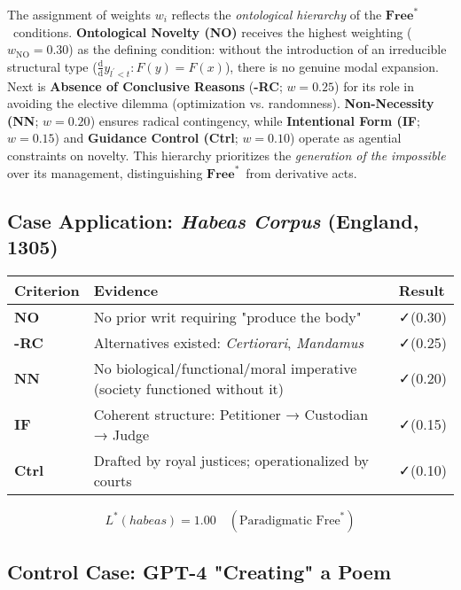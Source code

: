 \documentclass[11pt,a4paper]{article}
\newcommand{\Free}{\ensuremath{\mathbf{Free}^{\ast}}}
\begin{document}
The assignment of weights \(w_{i}\) reflects the \emph{ontological hierarchy} of the \Free\ conditions. \textbf{Ontological Novelty (NO)} receives the highest weighting (\(w_{\text{NO}}=0.30\)) as the defining condition: without the introduction of an irreducible structural type (\(\frac{\mathrm{d}}{\mathrm{d}}y_{l^{\prime}<t}:F(y)=F(x)\)), there is no genuine modal expansion. Next is \textbf{Absence of Conclusive Reasons} (\textbf{-RC}; \(w=0.25\)) for its role in avoiding the elective dilemma (optimization vs. randomness). \textbf{Non-Necessity (NN}; \(w=0.20\)) ensures radical contingency, while \textbf{Intentional Form (IF}; \(w=0.15\)) and \textbf{Guidance Control (Ctrl}; \(w=0.10\)) operate as agential constraints on novelty. This hierarchy prioritizes the \emph{generation of the impossible} over its management, distinguishing \Free\ from derivative acts.

\subsection{Case Application: \emph{Habeas Corpus} (England, 1305)}\label{sec:methods-habeas}

\begin{tabular}{l l l}
Criterion & Evidence & Result \\
\hline
\textbf{NO} & No prior writ requiring "produce the body" \cite[ p. 150]{tierney2023} & ✓(0.30) \\
\textbf{-RC} & Alternatives existed: \emph{Certiorari}, \emph{Mandamus} \cite[ p. 132]{epstein2021} & ✓(0.25) \\
\textbf{NN} & No biological/functional/moral imperative (society functioned without it) & ✓(0.20) \\
\textbf{IF} & Coherent structure: Petitioner → Custodian → Judge \cite[§4]{carbonell2022} & ✓(0.15) \\
\textbf{Ctrl} & Drafted by royal justices; operationalized by courts \cite[ p. 98]{shapiro2024} & ✓(0.10) \\
\end{tabular}

\[
L^{*}(habeas) = 1.00 \quad (\text{Paradigmatic Free}^{*})
\]

\subsection{Control Case: GPT-4 "Creating" a Poem}\label{sec:methods-gpt4}
\end{document}
